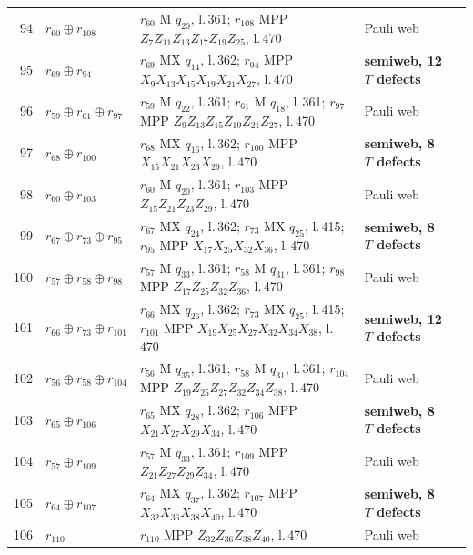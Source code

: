 \documentclass[11pt]{article}
\begin{document}
\begin{semiwebaddition}
{\begin{longtable}{rp{.3\linewidth}p{.43\linewidth}lr}
94 & $r_{60}\oplus r_{108}$ & $r_{60}$ M $q_{20}$, l.\,361; $r_{108}$ MPP $Z_{7}Z_{11}Z_{13}Z_{17}Z_{19}Z_{25}$, l.\,470 & Pauli web & \hyperref[d5_det094]{\pageref*{d5_det094}}\\
95 & $r_{69}\oplus r_{94}$ & $r_{69}$ MX $q_{14}$, l.\,362; $r_{94}$ MPP $X_{9}X_{13}X_{15}X_{19}X_{21}X_{27}$, l.\,470 & \textbf{semiweb, 12 $T$ defects} & \hyperref[d5_det095]{\pageref*{d5_det095}}\\
96 & $r_{59}\oplus r_{61}\oplus r_{97}$ & $r_{59}$ M $q_{22}$, l.\,361; $r_{61}$ M $q_{18}$, l.\,361; $r_{97}$ MPP $Z_{9}Z_{13}Z_{15}Z_{19}Z_{21}Z_{27}$, l.\,470 & Pauli web & \hyperref[d5_det096]{\pageref*{d5_det096}}\\
97 & $r_{68}\oplus r_{100}$ & $r_{68}$ MX $q_{16}$, l.\,362; $r_{100}$ MPP $X_{15}X_{21}X_{23}X_{29}$, l.\,470 & \textbf{semiweb, 8 $T$ defects} & \hyperref[d5_det097]{\pageref*{d5_det097}}\\
98 & $r_{60}\oplus r_{103}$ & $r_{60}$ M $q_{20}$, l.\,361; $r_{103}$ MPP $Z_{15}Z_{21}Z_{23}Z_{29}$, l.\,470 & Pauli web & \hyperref[d5_det098]{\pageref*{d5_det098}}\\
99 & $r_{67}\oplus r_{73}\oplus r_{95}$ & $r_{67}$ MX $q_{24}$, l.\,362; $r_{73}$ MX $q_{25}$, l.\,415; $r_{95}$ MPP $X_{17}X_{25}X_{32}X_{36}$, l.\,470 & \textbf{semiweb, 8 $T$ defects} & \hyperref[d5_det099]{\pageref*{d5_det099}}\\
100 & $r_{57}\oplus r_{58}\oplus r_{98}$ & $r_{57}$ M $q_{33}$, l.\,361; $r_{58}$ M $q_{31}$, l.\,361; $r_{98}$ MPP $Z_{17}Z_{25}Z_{32}Z_{36}$, l.\,470 & Pauli web & \hyperref[d5_det100]{\pageref*{d5_det100}}\\
101 & $r_{66}\oplus r_{73}\oplus r_{101}$ & $r_{66}$ MX $q_{26}$, l.\,362; $r_{73}$ MX $q_{25}$, l.\,415; $r_{101}$ MPP $X_{19}X_{25}X_{27}X_{32}X_{34}X_{38}$, l.\,470 & \textbf{semiweb, 12 $T$ defects} & \hyperref[d5_det101]{\pageref*{d5_det101}}\\
102 & $r_{56}\oplus r_{58}\oplus r_{104}$ & $r_{56}$ M $q_{35}$, l.\,361; $r_{58}$ M $q_{31}$, l.\,361; $r_{104}$ MPP $Z_{19}Z_{25}Z_{27}Z_{32}Z_{34}Z_{38}$, l.\,470 & Pauli web & \hyperref[d5_det102]{\pageref*{d5_det102}}\\
103 & $r_{65}\oplus r_{106}$ & $r_{65}$ MX $q_{28}$, l.\,362; $r_{106}$ MPP $X_{21}X_{27}X_{29}X_{34}$, l.\,470 & \textbf{semiweb, 8 $T$ defects} & \hyperref[d5_det103]{\pageref*{d5_det103}}\\
104 & $r_{57}\oplus r_{109}$ & $r_{57}$ M $q_{33}$, l.\,361; $r_{109}$ MPP $Z_{21}Z_{27}Z_{29}Z_{34}$, l.\,470 & Pauli web & \hyperref[d5_det104]{\pageref*{d5_det104}}\\
105 & $r_{64}\oplus r_{107}$ & $r_{64}$ MX $q_{37}$, l.\,362; $r_{107}$ MPP $X_{32}X_{36}X_{38}X_{40}$, l.\,470 & \textbf{semiweb, 8 $T$ defects} & \hyperref[d5_det105]{\pageref*{d5_det105}}\\
106 & $r_{110}$ & $r_{110}$ MPP $Z_{32}Z_{36}Z_{38}Z_{40}$, l.\,470 & Pauli web & \hyperref[d5_det106]{\pageref*{d5_det106}}\\
\bottomrule
\end{longtable}}
\newpage

\end{semiwebaddition}
\end{document}
